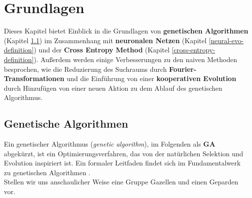 
\chapter{Grundlagen} \label{basics}

Dieses Kapitel bietet Einblick in die Grundlagen von \textbf{genetischen Algorithmen} (Kapitel \ref{ga-my-definition}) im Zusammenhang mit \textbf{neuronalen Netzen} (Kapitel \ref{neural-evo-definition}) und der \textbf{Cross Entropy Method} (Kapitel \ref{cross-entropy-definition}). Außerdem werden einige Verbesserungen zu den naiven Methoden besprochen, wie die Reduzierung des Suchraums durch \textbf{Fourier-Transformationen} und die Einführung von einer \textbf{kooperativen Evolution} durch Hinzufügen von einer neuen Aktion zu dem Ablauf des genetischen Algorithmus.

    \section{Genetische Algorithmen} \label{ga-my-definition}


        Ein genetischer Algorithmus (\textit{genetic algorithm}), im Folgenden als \textbf{GA} abgekürzt, ist ein Optimierungsverfahren, das von der natürlichen Selektion und Evolution inspiriert ist. Ein formaler Leitfaden findet sich im Fundamentalwerk zu genetischen Algorithmen \cite{ga}.\\[2mm]
        Stellen wir uns anschaulicher Weise eine Gruppe Gazellen und einen Geparden vor.\\

